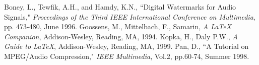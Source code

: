 \documentclass[oneside,onecolumn]{article}
\begin{document}

\begin{thebibliography}{2} %

 Boney, L., Tewfik, A.H., and Hamdy, K.N., ``Digital
  Watermarks for Audio Signals," \emph{Proceedings of the Third IEEE
    International Conference on Multimedia}, pp. 473-480, June 1996.
 Goossens, M., Mittelbach, F., Samarin, \emph{A LaTeX
  Companion}, Addison-Wesley, Reading, MA, 1994.
 Kopka, H., Daly P.W., \emph{A Guide to LaTeX},
  Addison-Wesley, Reading, MA, 1999.
 Pan, D., ``A Tutorial on MPEG/Audio Compression," \emph{IEEE
  Multimedia}, Vol.2, pp.60-74, Summer 1998.
  
\end{thebibliography}

\end{document}
